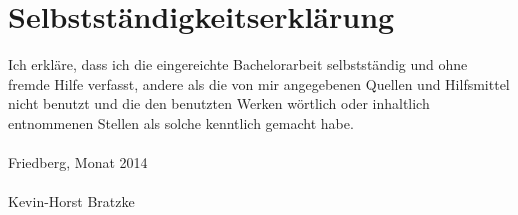 \chapter{Selbstständigkeitserklärung}
\label{cha:erklaerung}
%
%
Ich erkläre, dass ich die eingereichte Bachelorarbeit selbstständig und ohne fremde Hilfe verfasst, andere als die von mir angegebenen Quellen und Hilfsmittel nicht benutzt und die den benutzten Werken wörtlich oder inhaltlich entnommenen Stellen als solche kenntlich gemacht habe. \\
%
\vspace{.2cm} \\
\noindent Friedberg, Monat 2014 \\
%
\vspace{2cm} \\
\noindent Kevin-Horst Bratzke \\
%
%
%
